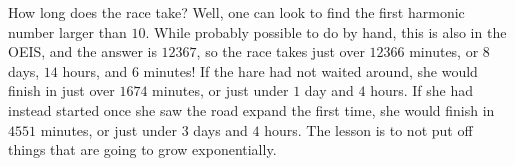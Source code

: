 \documentclass[11pt]{article}
\theoremstyle{definition}
\begin{document}
How long does the race take?  Well, one can look to find the first harmonic number larger than $10$.  While probably possible to do by hand, this is also in the OEIS, and the answer is $12367$, so the race takes just over $12366$ minutes, or $8$ days, $14$ hours, and $6$ minutes!  If the hare had not waited around, she would finish in just over $1674$ minutes, or just under $1$ day and $4$ hours.  If she had instead started once she saw the road expand the first time, she would finish in $4551$ minutes, or just under $3$ days and $4$ hours.  The lesson is to not put off things that are going to grow exponentially. 
\end{document}
